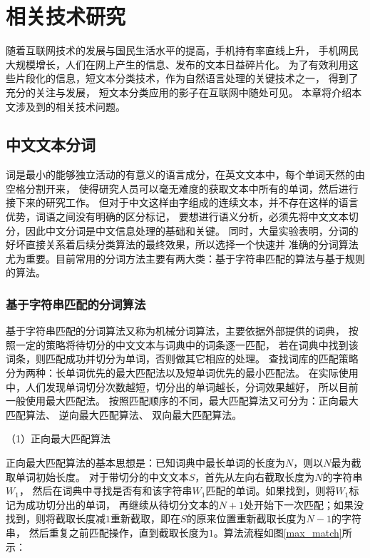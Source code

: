 \chapter{相关技术研究}
随着互联网技术的发展与国民生活水平的提高，手机持有率直线上升，
手机网民大规模增长，人们在网上产生的信息、发布的文本日益碎片化。
为了有效利用这些片段化的信息，短文本分类技术，作为自然语言处理的关键技术之一，
得到了充分的关注与发展，
短文本分类应用的影子在互联网中随处可见。
本章将介绍本文涉及到的相关技术问题。
\iffalse
\section{中文文本分词}
\label{word_seg}
词是最小的能够独立活动的有意义的语言成分，在英文文本中，每个单词天然的由空格分割开来，
使得研究人员可以毫无难度的获取文本中所有的单词，然后进行接下来的研究工作。
但对于中文这样由字组成的连续文本，并不存在这样的语言优势，词语之间没有明确的区分标记，
要想进行语义分析，必须先将中文文本切分，因此中文分词是中文信息处理的基础和关键。
同时，大量实验表明，分词的好坏直接关系着后续分类算法的最终效果，所以选择一个快速并
准确的分词算法尤为重要。目前常用的分词方法主要有两大类：基于字符串匹配的算法与基于规则的算法。
\subsection{基于字符串匹配的分词算法}
基于字符串匹配的分词算法又称为机械分词算法，主要依据外部提供的词典，
按照一定的策略将待切分的中文文本与词典中的词条逐一匹配，
若在词典中找到该词条，则匹配成功并切分为单词，否则做其它相应的处理。
查找词库的匹配策略分为两种：长单词优先的最大匹配法以及短单词优先的最小匹配法。
在实际使用中，人们发现单词切分次数越短，切分出的单词越长，分词效果越好，
所以目前一般使用最大匹配法。
按照匹配顺序的不同，最大匹配算法又可分为：正向最大匹配算法、
逆向最大匹配算法、
双向最大匹配算法。

（1）正向最大匹配算法

正向最大匹配算法的基本思想是：已知词典中最长单词的长度为$N$，则以$N$最为截取单词初始长度。
对于带切分的中文文本$S$，首先从左向右截取长度为$N$的字符串$W_{1}$，
然后在词典中寻找是否有和该字符串$W_{1}$匹配的单词。如果找到，则将$W_{1}$标记为成功切分出的单词，
再继续从待切分文本的$N+1$处开始下一次匹配；如果没找到，则将截取长度减$1$重新截取，即在$S$的原来位置重新截取长度为$N-1$的字符串，
然后重复之前匹配操作，直到截取长度为$1$。算法流程如图\ref{max_match}所示：

